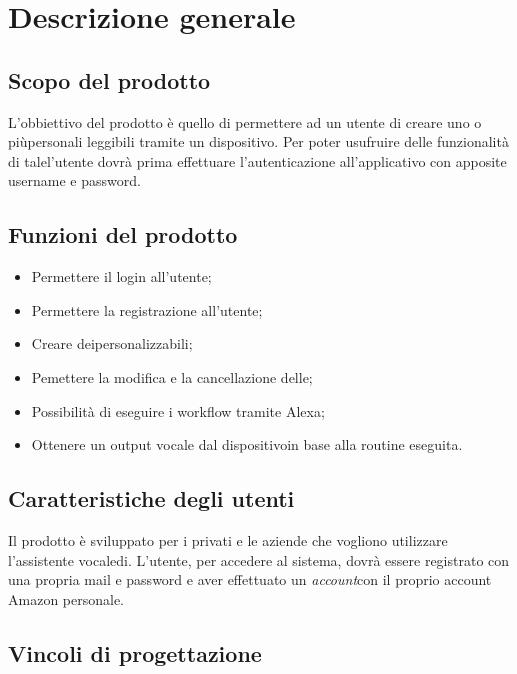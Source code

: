 \chapter{Descrizione generale}

\section{Scopo del prodotto}
L'obbiettivo del prodotto è quello di permettere ad un utente di creare uno o piùpersonali leggibili tramite un dispositivo.
Per poter usufruire delle funzionalità di talel'utente dovrà prima effettuare l'autenticazione all'applicativo con apposite username e password.

\section{Funzioni del prodotto}
\begin{itemize}
	\item Permettere il login all'utente;
	\item Permettere la registrazione all'utente;
	\item Creare deipersonalizzabili;
	\item Pemettere la modifica e la cancellazione delle;
	\item Possibilità di eseguire i workflow tramite Alexa;
	\item Ottenere un output vocale dal dispositivoin base alla routine eseguita.
\end{itemize}

\section{Caratteristiche degli utenti}
Il prodotto è sviluppato per i privati e le aziende che vogliono utilizzare l'assistente vocaledi.
L'utente, per accedere al sistema, dovrà essere registrato con una propria mail e password e aver effettuato un \textit{account}con il proprio account Amazon personale.


\section{Vincoli di progettazione}
